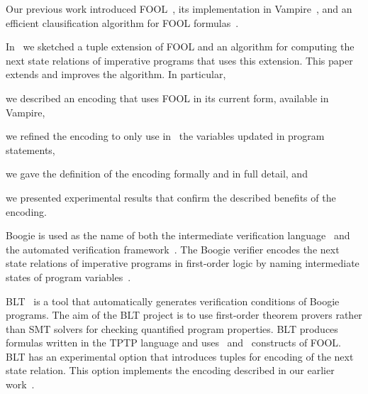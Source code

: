 
Our previous work introduced FOOL~\cite{FOOL}, its implementation in Vampire~\cite{VampireAndFOOL}, and an efficient clausification algorithm for FOOL formulas~\cite{FOOLCNF}.

In~\cite{VampireAndFOOL} we sketched a tuple extension of FOOL and an algorithm for computing the next state relations of imperative programs that uses this extension. This paper extends and improves the algorithm. In particular, \begin{enumerate*}[label=(\roman*)]\item we described an encoding that uses FOOL in its current form, available in Vampire, \item we refined the encoding to only use in \LETIN\ the variables updated in program statements, \item we gave the definition of the encoding formally and in full detail, and \item we presented experimental results that confirm the described benefits of the encoding.\end{enumerate*}

Boogie is used as the name of both the intermediate verification language~\cite{leino2008boogie} and the automated verification framework~\cite{DBLP:conf/fmco/BarnettCDJL05}. The Boogie verifier encodes the next state relations of imperative programs in first-order logic by naming intermediate states of program variables~\cite{DBLP:journals/ipl/Leino05}.

BLT~\cite{CF-iFM17} is a tool that automatically generates verification conditions of Boogie programs. The aim of the BLT project is to use first-order theorem provers rather than SMT solvers for checking quantified program properties. BLT produces formulas written in the TPTP language and uses \ITE\ and \LETIN\ constructs of FOOL. BLT has an experimental option that introduces tuples for encoding of the next state relation. This option implements the encoding described in our earlier work~\cite{VampireAndFOOL}.
